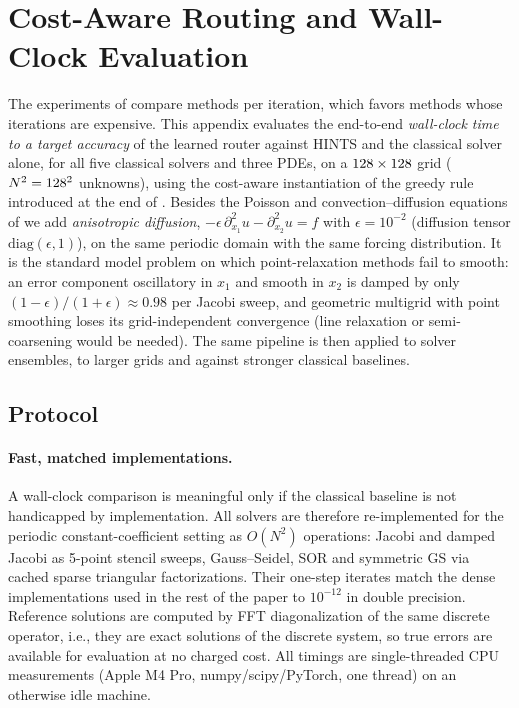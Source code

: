 \section{Cost-Aware Routing and Wall-Clock Evaluation} \label{sec:wallclock}

The experiments of  compare methods per iteration, which favors methods whose iterations are expensive. This appendix evaluates the end-to-end \emph{wall-clock time to a target accuracy} of the learned router against HINTS and the classical solver alone, for all five classical solvers and three PDEs, on a $128\times128$ grid ($N^2 = 128^2$ unknowns), using the cost-aware instantiation of the greedy rule introduced at the end of . Besides the Poisson and convection--diffusion equations of  we add \emph{anisotropic diffusion}, $-\epsilon\,\partial_{x_1}^2 u - \partial_{x_2}^2 u = f$ with $\epsilon = 10^{-2}$ (diffusion tensor $\mathrm{diag}(\epsilon, 1)$), on the same periodic domain with the same forcing distribution. It is the standard model problem on which point-relaxation methods fail to smooth: an error component oscillatory in $x_1$ and smooth in $x_2$ is damped by only $(1-\epsilon)/(1+\epsilon) \approx 0.98$ per Jacobi sweep, and geometric multigrid with point smoothing loses its grid-independent convergence (line relaxation or semi-coarsening would be needed). The same pipeline is then applied to solver ensembles, to larger grids and against stronger classical baselines.

\subsection{Protocol}

\paragraph{Fast, matched implementations.} A wall-clock comparison is meaningful only if the classical baseline is not handicapped by implementation. All solvers are therefore re-implemented for the periodic constant-coefficient setting as $O(N^2)$ operations: Jacobi and damped Jacobi as 5-point stencil sweeps, Gauss--Seidel, SOR and symmetric GS via cached sparse triangular factorizations. Their one-step iterates match the dense implementations used in the rest of the paper to $10^{-12}$ in double precision. Reference solutions are computed by FFT diagonalization of the same discrete operator, i.e., they are exact solutions of the discrete system, so true errors are available for evaluation at no charged cost. All timings are single-threaded CPU measurements (Apple M4 Pro, numpy/scipy/PyTorch, one thread) on an otherwise idle machine.

